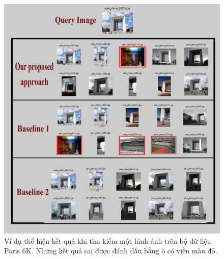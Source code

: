 \begin{figure}[!htbp]
\begin{center}
      \includegraphics[scale=0.2]{resParis6k}
    \fi
    \caption[Ví dụ thể hiện kết quả khi tìm kiếm một hình ảnh trên bộ dữ liệu Paris 6K]{Ví dụ thể hiện kết quả khi tìm kiếm một hình ảnh trên bộ dữ liệu Paris 6K. Những kết quả sai được đánh dấu bằng ô có viền màu đỏ.}
    \label{FigResultsParis}
  \end{center}
\end{figure}

%

